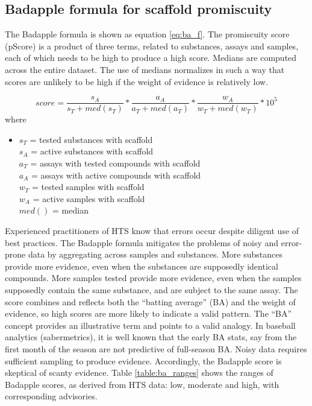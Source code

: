 \subsection{Badapple formula for scaffold promiscuity}

The Badapple formula is shown as equation \ref{eq:ba_f}. The promiscuity score (pScore) is a product of three terms, related to substances, assays and samples, each of which needs to be high to produce a high score. Medians are computed across the entire dataset. The use of medians normalizes in such a way that scores are unlikely to be high if the weight of evidence is relatively low.

\begin{equation}
score = \frac{s_A}{s_T + med(s_T)} * \frac{a_A}{a_T + med(a_T)} * \frac{w_A}{w_T + med(w_T)} * 10^5
\label{eq:ba_formula}
\end{equation}
where \\
\begin{itemize}
\item[] $s_T$ = tested substances with scaffold \\ 
$s_A$ = active substances with scaffold \\ 
$a_T$ = assays with tested compounds with scaffold \\
$a_A$ = assays with active compounds with scaffold \\ 
$w_T$ = tested samples with scaffold \\
$w_A$ = active samples with scaffold \\
$med()$ = median
\end{itemize}

Experienced practitioners of HTS know that errors occur despite diligent use of best practices. The Badapple formula mitigates the problems of noisy and error-prone data by aggregating across samples and substances. More substances provide more evidence, even when the substances are supposedly identical compounds. More samples tested provide more evidence, even when the samples supposedly contain the same substance, and are subject to the same assay. The score combines and reflects both the “batting average” (BA) and the weight of evidence, so high scores are more likely to indicate a valid pattern. The “BA” concept provides an illustrative term and points to a valid analogy. In baseball analytics (sabermetrics), it is well known that the early BA stats, say from the first month of the season are not predictive of full-season BA\cite{Draper2013-at}. Noisy data requires sufficient sampling to produce evidence. Accordingly, the Badapple score is skeptical of scanty evidence. Table \ref{table:ba_ranges} shows the ranges of Badapple scores, as derived from HTS data: low, moderate and high, with corresponding advisories.

